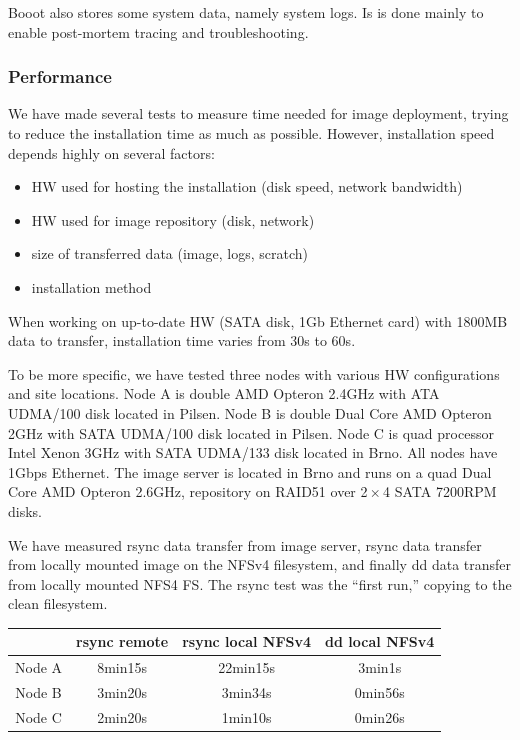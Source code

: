 \documentclass[a4paper]{article}
\begin{document}
Booot also stores some system data, namely system logs. Is is done mainly
to enable post-mortem tracing and troubleshooting.

\subsubsection{Performance}

We have made several tests to measure time needed for image deployment, trying to reduce the installation time as much as possible. However, installation speed depends highly on several factors:

\begin{itemize}
\item HW used for hosting the installation (disk speed, network bandwidth)
\item HW used for image repository (disk, network)
\item size of transferred data (image, logs, scratch)
\item installation method
\end{itemize}

When working on up-to-date HW (SATA disk, 1Gb Ethernet card) with 1800MB data
to transfer, installation time varies from 30s to 60s.

To be more specific, we have tested three nodes with various HW
configurations and site locations. Node A is double AMD Opteron 2.4GHz with
ATA UDMA/100 disk located in Pilsen. Node B is double Dual Core AMD Opteron
2GHz with SATA UDMA/100 disk located in Pilsen. Node C is quad processor
Intel Xenon 3GHz with SATA UDMA/133 disk located in Brno. All nodes have
1Gbps Ethernet. The image server is located in Brno and runs on a quad Dual
Core AMD Opteron 2.6GHz, repository on RAID51 over 2${}\times{}$4 SATA 7200RPM disks.

We have measured rsync data transfer from image server, rsync data transfer
from locally mounted image on the NFSv4 filesystem, and finally dd data
transfer from locally mounted NFS4 FS. The rsync test was the ``first
run,'' copying to the clean filesystem.

\bigskip

\begin{tabular}{|c|c|c|c|}
\hline
 & rsync remote & rsync local NFSv4 & dd local NFSv4 \\
\hline
Node A & 8min15s & 22min15s & 3min1s \\
\hline
Node B & 3min20s & 3min34s & 0min56s \\
\hline
Node C & 2min20s & 1min10s & 0min26s \\
\hline
\end{tabular}
\end{document}
